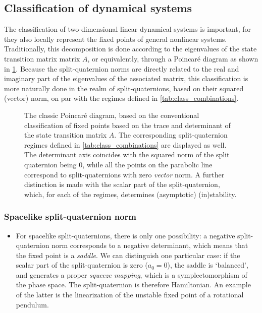 \subsection{Classification of dynamical systems}
The classification of two-dimensional linear dynamical systems is important, for they also locally represent the fixed points of general nonlinear systems. Traditionally, this decomposition is done according to the eigenvalues of the state transition matrix matrix $A$, or equivalently, through a Poincaré diagram as shown in \cref{fig:poincare_diagram}. Because the split-quaternion norms are directly related to the real and imaginary part of the eigenvalues of the associated matrix, this classification is more naturally done in the realm of split-quaternions, based on their squared (vector) norm, on par with the regimes defined in \cref{tab:class_combinations}.
\begin{figure}[h!]
    \centering
    
    \caption{The classic Poincaré diagram, based on the conventional classification of fixed points based on the trace and determinant of the state transition matrix $A$. The corresponding split-quaternion regimes defined in \cref{tab:class_combinations} are displayed as well. The determinant axis coincides with the squared norm of the split quaternion being 0, while all the points on the parabolic line correspond to split-quaternions with zero \emph{vector} norm. A further distinction is made with the scalar part of the split-quaternion, which, for each of the regimes, determines (asymptotic) (in)stability.}
    \label{fig:poincare_diagram}
\end{figure}

\subsubsection*{Spacelike split-quaternion norm}
    \begin{itemize}
        \item[\circled{1}] For spacelike split-quaternions, there is only one possibility: a negative split-quaternion norm corresponds to a negative determinant, which means that the fixed point is a \emph{saddle}. We can distinguish one particular case: if the scalar part of the split-quaternion is zero ($a_0 = 0$), the saddle is `balanced', and generates a proper \emph{squeeze mapping}, which is a symplectomorphism of the phase space. The split-quaternion is therefore Hamiltonian. An example of the latter is the linearization of the unstable fixed point of a rotational pendulum.
    \end{itemize}

